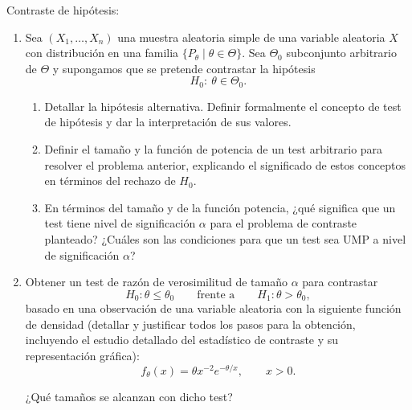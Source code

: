 \documentclass[12pt]{article}
\begin{document}
    \begin{ejercicio}[2,4 puntos]
        Contraste de hipótesis:

        \begin{enumerate}
            \item[a)] Sea $(X_1,\dots,X_n)$ una muestra aleatoria simple de una variable aleatoria $X$
            con distribución en una familia $\{P_\theta \mid \theta \in \Theta\}$. Sea $\Theta_0$
            subconjunto arbitrario de $\Theta$ y supongamos que se pretende contrastar la hipótesis
            $$
            H_0:\ \theta \in \Theta_0.
            $$

            \begin{enumerate}
                \item[a1)] Detallar la hipótesis alternativa. Definir formalmente el concepto de test de
                hipótesis y dar la interpretación de sus valores.

                \item[a2)] Definir el tamaño y la función de potencia de un test arbitrario para resolver el
                problema anterior, explicando el significado de estos conceptos en términos del rechazo
                de $H_0$.

                \item[a3)] En términos del tamaño y de la función potencia, ¿qué significa que un test tiene
                nivel de significación $\alpha$ para el problema de contraste planteado? ¿Cuáles son las
                condiciones para que un test sea UMP a nivel de significación $\alpha$?
            \end{enumerate}

            \item[b)] Obtener un test de razón de verosimilitud de tamaño $\alpha$ para contrastar
            $$H_0: \theta \le \theta_0 \qquad \text{frente a} \qquad H_1: \theta > \theta_0,$$
            basado en una observación de una variable aleatoria con la siguiente función de densidad
            (detallar y justificar todos los pasos para la obtención, incluyendo el estudio detallado
            del estadístico de contraste y su representación gráfica):
            $$
            f_\theta(x)=\theta x^{-2} e^{-\theta/x}, \qquad x>0.
            $$

            ¿Qué tamaños se alcanzan con dicho test?
        \end{enumerate}
    \end{ejercicio}
\end{document}

